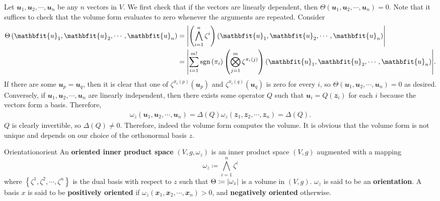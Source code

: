 \documentclass[math]{amznotes}
\theoremstyle{remark}
\begin{document}
Let $\mathbfit{u}_1, \mathbfit{u}_2, \cdots, \mathbfit{u}_n$ be any $n$ vectors in $V$. We first check that if the vectors are linearly dependent, then $\Theta\left(\mathbfit{u}_1, \mathbfit{u}_2, \cdots, \mathbfit{u}_n\right) = 0$. Note that it suffices to check that the volume form evaluates to zero whenever the arguments are repeated. Consider 
\begin{align*}
    \Theta\left(\mathbfit{u}_1, \mathbfit{u}_2, \cdots, \mathbfit{u}_n\right) & = \abs{\left(\bigwedge_{i = 1}^n\zeta^i\right)\left(\mathbfit{u}_1, \mathbfit{u}_2, \cdots, \mathbfit{u}_n\right)} \\
    & = \abs{\sum_{i = 1}^{m!}\mathrm{sgn}\left(\pi_i\right)\left(\bigotimes_{j = 1}^m\zeta^{\pi_i(j)}\right)\left(\mathbfit{u}_1, \mathbfit{u}_2, \cdots, \mathbfit{u}_n\right)}.
\end{align*}
If there are some $\mathbfit{u}_p = \mathbfit{u}_q$, then it is clear that one of $\zeta^{\pi_i(p)}\left(\mathbfit{u}_p\right)$ and $\zeta^{\pi_i(q)}\left(\mathbfit{u}_q\right)$ is zero for every $i$, so $\Theta\left(\mathbfit{u}_1, \mathbfit{u}_2, \cdots, \mathbfit{u}_n\right) = 0$ as desired. Conversely, if $\mathbfit{u}_1, \mathbfit{u}_2, \cdots, \mathbfit{u}_n$ are linearly independent, then there exists some operator $Q$ such that $\mathbfit{u}_i = Q\left(\mathbfit{z}_i\right)$ for each $i$ because the vectors form a basis. Therefore, 
\begin{align*}
    \omega_z\left(\mathbfit{u}_1, \mathbfit{u}_2, \cdots, \mathbfit{u}_n\right) = \Delta(Q)\omega_z\left(\mathbfit{z}_1, \mathbfit{z}_2, \cdots, \mathbfit{z}_n\right) = \Delta(Q).
\end{align*}
$Q$ is clearly invertible, so $\Delta(Q) \neq 0$. Therefore, indeed the volume form computes the volume. It is obvious that the volume form is not unique and depends on our choice of the orthonormal basis $z$.
\begin{dfnbox}{Orientation}{orient}
    An {\color{red} \textbf{oriented inner product space}} $(V, g, \omega_z)$ is an inner product space $(V, g)$ augmented with a mapping 
    \begin{equation*}
        \omega_z \coloneqq \bigwedge_{i = 1}^n\zeta^i
    \end{equation*}
    where $\left\{\zeta^1, \zeta^2, \cdots, \zeta^n\right\}$ is the dual basis with respect to $z$ such that $\Theta \coloneqq {\left\lvert {\omega_z} \right\rvert}$ is a volume in $(V, g)$. $\omega_z$ is said to be an {\color{red} \textbf{orientation}}. A basis $x$ is said to be {\color{red} \textbf{positively oriented}} if $\omega_z\left(\mathbfit{x}_1, \mathbfit{x}_2, \cdots, \mathbfit{x}_n\right) > 0$, and {\color{red} \textbf{negatively oriented}} otherwise.
\end{dfnbox}
\end{document}
